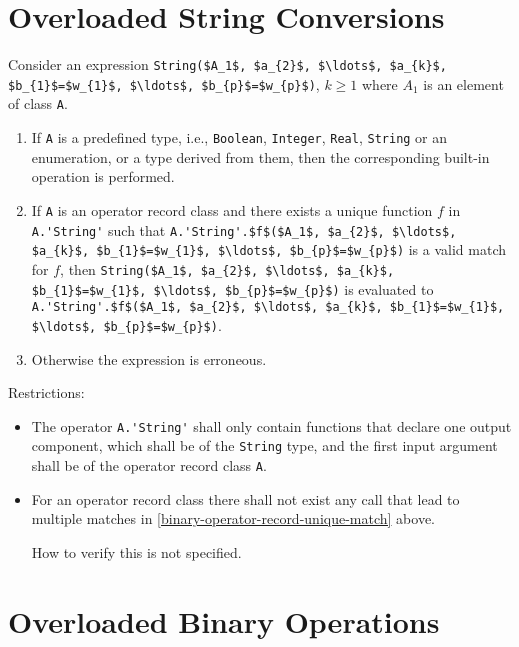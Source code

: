 \section{Overloaded String Conversions}\label{overloaded-string-conversions}

Consider an expression \lstinline!String($A_1$, $a_{2}$, $\ldots$, $a_{k}$, $b_{1}$=$w_{1}$, $\ldots$, $b_{p}$=$w_{p}$)!, $k \geq 1$ where $A_1$ is an element of class \lstinline!A!.

\begin{enumerate}
\item
  If \lstinline!A! is a predefined type, i.e., \lstinline!Boolean!, \lstinline!Integer!, \lstinline!Real!, \lstinline!String! or an enumeration, or a type derived from them, then the corresponding built-in operation is performed.
\item\label{binary-operator-record-unique-match}
  If \lstinline!A! is an operator record class and there exists a unique function $f$ in \lstinline!A.'String'! such that
  \lstinline!A.'String'.$f$($A_1$, $a_{2}$, $\ldots$, $a_{k}$, $b_{1}$=$w_{1}$, $\ldots$, $b_{p}$=$w_{p}$)!
  is a valid match for $f$, then
  \lstinline!String($A_1$, $a_{2}$, $\ldots$, $a_{k}$, $b_{1}$=$w_{1}$, $\ldots$, $b_{p}$=$w_{p}$)!
  is evaluated to\\
  \lstinline!A.'String'.$f$($A_1$, $a_{2}$, $\ldots$, $a_{k}$, $b_{1}$=$w_{1}$, $\ldots$, $b_{p}$=$w_{p}$)!.
\item
  Otherwise the expression is erroneous.
\end{enumerate}

Restrictions:
\begin{itemize}
\item
  The operator \lstinline!A.'String'! shall only contain functions that declare one output component, which shall be of the \lstinline!String! type, and the first input argument shall be of the operator record class \lstinline!A!.
\item
  For an operator record class there shall not exist any call that lead to multiple matches in \cref{binary-operator-record-unique-match} above.
  \begin{nonnormative}
  How to verify this is not specified.
  \end{nonnormative}
\end{itemize}

\section{Overloaded Binary Operations}\label{overloaded-binary-operations}

